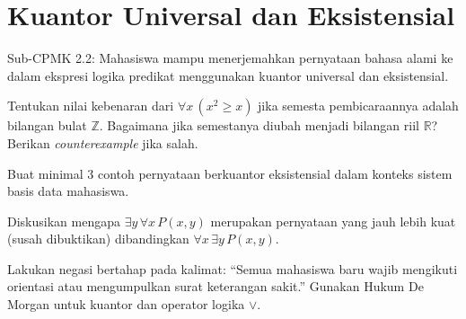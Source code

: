 \documentclass[../main]{subfiles}
\begin{document}
\chapter{Kuantor Universal dan Eksistensial}

\begin{subcpmk}
  \item Sub-CPMK 2.2: Mahasiswa mampu menerjemahkan pernyataan bahasa alami ke dalam ekspresi logika predikat menggunakan kuantor universal dan eksistensial.
\end{subcpmk}










\begin{aktivitas}
  \item Tentukan nilai kebenaran dari $\forall x \, (x^2 \ge x)$ jika semesta pembicaraannya adalah bilangan bulat $\mathbb{Z}$. Bagaimana jika semestanya diubah menjadi bilangan riil $\mathbb{R}$? Berikan \textit{counterexample} jika salah.
  \item Buat minimal 3 contoh pernyataan berkuantor eksistensial dalam konteks sistem basis data mahasiswa.
  \item Diskusikan mengapa $\exists y \, \forall x \, P(x, y)$ merupakan pernyataan yang jauh lebih kuat (susah dibuktikan) dibandingkan $\forall x \, \exists y \, P(x, y)$.
  \item Lakukan negasi bertahap pada kalimat: ``Semua mahasiswa baru wajib mengikuti orientasi atau mengumpulkan surat keterangan sakit.'' Gunakan Hukum De Morgan untuk kuantor dan operator logika $\lor$.
\end{aktivitas}

\end{document}
